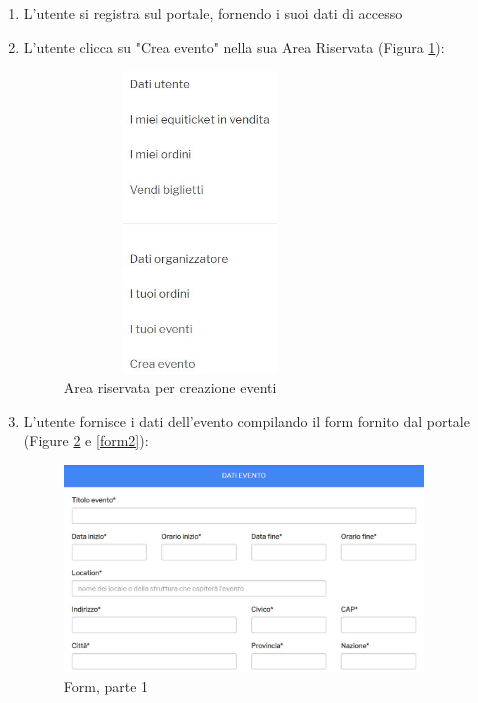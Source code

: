 \begin{enumerate}
\item L'utente si registra sul portale, fornendo i suoi dati di accesso
\item L'utente clicca su "Crea evento" nella sua Area Riservata (Figura \ref{crea}):
\begin{figure}[htbp]
	\centering
	\includegraphics[width=0.68\textwidth, height=8cm]{chapter4/immagini/creaevento}
	\caption{Area riservata per creazione eventi}
	\label{crea}
\end{figure} 
\item L'utente fornisce i dati dell'evento compilando il form fornito dal portale (Figure \ref{form1} e \ref{form2}):
\begin{figure}[htbp]
    \centering		
    \begin{minipage}{0.45\textwidth}
        \centering
        \includegraphics[width=0.9\textwidth]{chapter4/immagini/form1} %
        \caption{Form, parte 1}
				\label{form1}
    \end{minipage}\hfill
    \begin{minipage}{0.45\textwidth}

\end{minipage}
\end{figure}
\end{enumerate}
